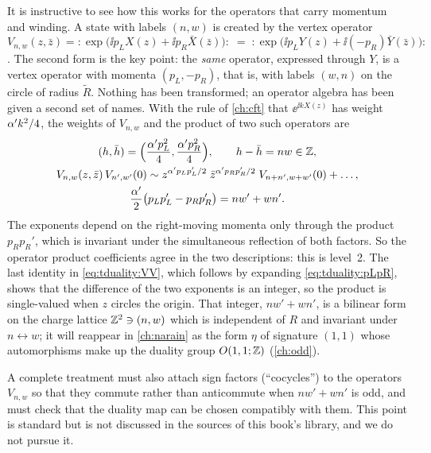 It is instructive to see how this works for the operators that carry momentum and winding. A
state with labels $(n,w)$ is created by the vertex operator
\begin{equation}\label{eq:tduality:vertex}
  V_{n,w}(z,\bar z)={:}\exp\!\big(\ii p_LX(z)+\ii p_R\bar X(\bar z)\big){:}
   \;=\;{:}\exp\!\big(\ii p_LY(z)+\ii(-p_R)\bar Y(\bar z)\big){:}
\end{equation}
. The second form is the key point: the \emph{same}
operator, expressed through $Y$, is a vertex operator with momenta $(p_L,-p_R)$, that is, with
labels $(w,n)$ on the circle of radius $\tilde R$. Nothing has been transformed; an operator
algebra has been given a second set of names. With the rule of \cref{ch:cft} that
$\ee^{\ii kX(z)}$ has weight $\alpha' k^2/4$, the weights of $V_{n,w}$ and the product of two such
operators are
\begin{gather}
  (h,\bar h)=\Big(\frac{\alpha' p_L^2}4,\frac{\alpha' p_R^2}4\Big),\qquad h-\bar h=nw\in\mathbb{Z},
   \label{eq:tduality:weights}\\
  V_{n,w}(z,\bar z)\,V_{n',w'}(0)\sim
   z^{\alpha' p_Lp_L'/2}\;\bar z^{\alpha' p_Rp_R'/2}\;V_{n+n',w+w'}(0)+\dots,\notag\\
   \frac{\alpha'}2\big(p_Lp_L'-p_Rp_R'\big)=nw'+wn' .\label{eq:tduality:VV}
\end{gather}
The exponents depend on the right-moving momenta only through the product $p_Rp_R'$, which is
invariant under the simultaneous reflection of both factors. So the operator product
coefficients agree in the two descriptions: this is level~2. The last identity in
\eqref{eq:tduality:VV}, which follows by expanding \eqref{eq:tduality:pLpR}, shows that the
difference of the two exponents is an integer, so the product is single-valued when $z$
circles the origin. That integer, $nw'+wn'$, is a bilinear form on the charge lattice
$\mathbb{Z}^2\ni(n,w)$ which is independent of $R$ and invariant under $n\leftrightarrow w$; it will
reappear in \cref{ch:narain} as the form $\eta$ of signature $(1,1)$ whose automorphisms make
up the duality group $O(1,1;\mathbb{Z})$ (\cref{ch:odd}).

\begin{remark}
A complete treatment must also attach sign factors (``cocycles'') to the operators
$V_{n,w}$ so that they commute rather than anticommute when $nw'+wn'$ is odd, and must check
that the duality map can be chosen compatibly with them. This point is standard but is not
discussed in the sources of this book's library, and we do not pursue it.
\end{remark}

